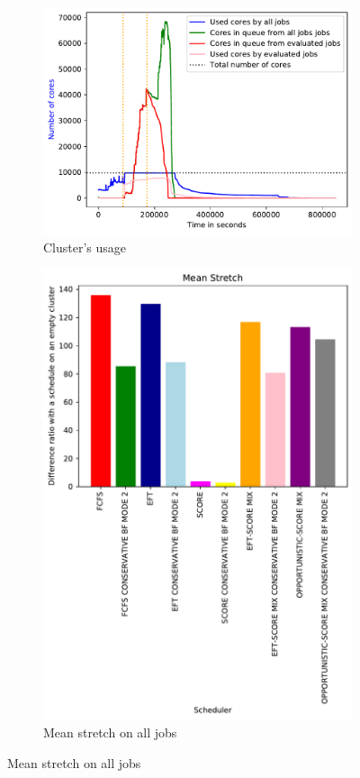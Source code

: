 \documentclass[a4paper]{article}
\begin{document}
\begin{figure}[H]\centering
\begin{subfigure}[b]{0.4\linewidth}\centering\includegraphics[width=1\linewidth]{MBSS/plot/2022-08-16->2022-08-16_V9271_Fcfs_Used_nodes_450_128_32_256_4_1024.pdf}\caption{Cluster's usage}\end{subfigure}
\begin{subfigure}[b]{0.4\linewidth}\centering\includegraphics[width=0.9\linewidth]{MBSS/plot/Results_FCFS_Score_Backfill_2022-08-16->2022-08-16_V9271_Mean_Stretch_450_128_32_256_4_1024.pdf}\caption{Mean stretch on all jobs}\end{subfigure}

\end{figure}
\end{document}
